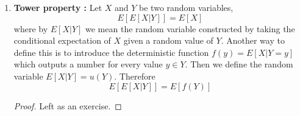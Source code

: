 \begin{enumerate}
\begin{proof}
\begin{align*}
     &= \left( \sum_{x \in S_X} xP(X=x)\right)\left( \sum_{y \in S_Y} yP(X=x)\right)= E[X]E[Y]
    \end{align*}
    \end{proof}
    \item {\bf Tower property \cite[Theorem 3.5.2]{evans}:} Let $X$ and $Y$ be two random variables,  
   \begin{equation*}
   E[E[X|Y]] = E[X]
   \end{equation*}
   where by $E[X|Y]$ we mean the random variable constructed by taking the conditional expectation of $X$ given a random value of $Y$. Another way to define this is to introduce the deterministic function  $f(y) = E[X|Y=y]$ which outputs a number for every value $y \in Y$. Then we define the random variable $E[X|Y] = u(Y)$.  Therefore
   \begin{equation*}
   E[E[X|Y]]  = E[f(Y)] 
   \end{equation*}
   \begin{proof}
   Left as an exercise. 
   \end{proof}
  \end{enumerate}

  
  
